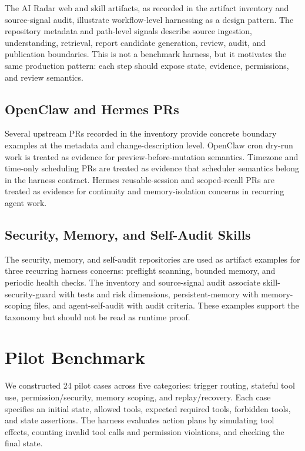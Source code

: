 \documentclass[11pt]{article}
\begin{document}
The AI Radar web and skill artifacts, as recorded in the artifact inventory and source-signal audit, illustrate workflow-level harnessing as a design pattern. The repository metadata and path-level signals describe source ingestion, understanding, retrieval, report candidate generation, review, audit, and publication boundaries. This is not a benchmark harness, but it motivates the same production pattern: each step should expose state, evidence, permissions, and review semantics.

\subsection{OpenClaw and Hermes PRs}

Several upstream PRs recorded in the inventory provide concrete boundary examples at the metadata and change-description level. OpenClaw cron dry-run work is treated as evidence for preview-before-mutation semantics. Timezone and time-only scheduling PRs are treated as evidence that scheduler semantics belong in the harness contract. Hermes reusable-session and scoped-recall PRs are treated as evidence for continuity and memory-isolation concerns in recurring agent work.

\subsection{Security, Memory, and Self-Audit Skills}

The security, memory, and self-audit repositories are used as artifact examples for three recurring harness concerns: preflight scanning, bounded memory, and periodic health checks. The inventory and source-signal audit associate skill-security-guard with tests and risk dimensions, persistent-memory with memory-scoping files, and agent-self-audit with audit criteria. These examples support the taxonomy but should not be read as runtime proof.

\section{Pilot Benchmark}

We constructed 24 pilot cases across five categories: trigger routing, stateful tool use, permission/security, memory scoping, and replay/recovery. Each case specifies an initial state, allowed tools, expected required tools, forbidden tools, and state assertions. The harness evaluates action plans by simulating tool effects, counting invalid tool calls and permission violations, and checking the final state.
\end{document}
